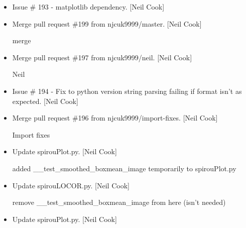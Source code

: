 \documentclass[a4paper,10pt,english]{report}
\begin{document}
\begin{itemize}
\item {} 
Issue \# 193 - matplotlib dependency. {[}Neil Cook{]}

\item {} 
Merge pull request \#199 from njcuk9999/master. {[}Neil Cook{]}

merge

\item {} 
Merge pull request \#197 from njcuk9999/neil. {[}Neil Cook{]}

Neil

\item {} 
Issue \# 194 - Fix to python version string parsing failing if format
isn’t as expected. {[}Neil Cook{]}

\item {} 
Merge pull request \#196 from njcuk9999/import-fixes. {[}Neil Cook{]}

Import fixes

\item {} 
Update spirouPlot.py. {[}Neil Cook{]}

added \_\_test\_smoothed\_boxmean\_image temporarily to spirouPlot.py

\item {} 
Update spirouLOCOR.py. {[}Neil Cook{]}

remove \_\_test\_smoothed\_boxmean\_image from here (isn’t needed)

\item {} 
Update spirouPlot.py. {[}Neil Cook{]}

\end{itemize}
\end{document}
